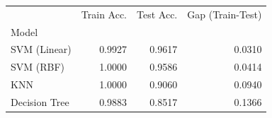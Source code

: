 \begin{tabular}{lrrr}
\toprule
 & Train Acc. & Test Acc. & Gap (Train-Test) \\
Model &  &  &  \\
\midrule
SVM (Linear) & 0.9927 & 0.9617 & 0.0310 \\
SVM (RBF) & 1.0000 & 0.9586 & 0.0414 \\
KNN & 1.0000 & 0.9060 & 0.0940 \\
Decision Tree & 0.9883 & 0.8517 & 0.1366 \\
\bottomrule
\end{tabular}
